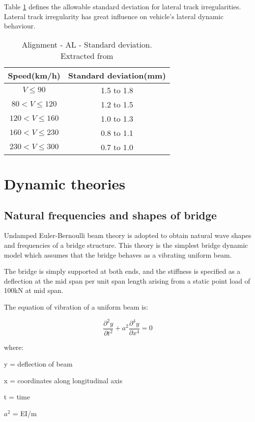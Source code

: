 Table \ref{tab:lateraldeviation} defines the allowable standard deviation for lateral track irregularities. Lateral track irregularity has great influence on vehicle's lateral dynamic behaviour.

\begin{table}[h]
    \centering
    \caption{Alignment - AL - Standard deviation. Extracted from \citet[Table B.6]{13848}}
    \begin{tabular}{cc}
        \hline
        Speed(km/h) & Standard deviation(mm) \\
        \hline
        $V\leq 90$ & 1.5 to 1.8 \\
        $80 < V \leq 120$ & 1.2 to 1.5 \\
        $120 < V \leq 160$ & 1.0 to 1.3 \\
        $160 <V \leq 230$ & 0.8 to 1.1 \\
        $230 <V \leq 300$ & 0.7 to 1.0 \\
        \hline
    \end{tabular}
    \label{tab:lateraldeviation}
\end{table}


\section{Dynamic theories}

\subsection{Natural frequencies and shapes of bridge}
Undamped Euler-Bernoulli beam theory is adopted to obtain natural wave shapes and frequencies of a bridge structure. This theory is the simplest bridge dynamic model which assumes that the bridge behaves as a vibrating uniform beam. 

The bridge is simply supported at both ends, and the stiffness is specified as a deflection at the mid span per unit span length arising from a static point load of 100kN at mid span.

The equation of vibration of a uniform beam is:

$$\frac{\partial^2 y}{\partial t^2} + a^2\frac{\partial^4 y}{\partial x^4}=0$$

where: 

y = deflection of beam

x = coordinates along longitudinal axis

t = time 

$a^2$ = EI/m

